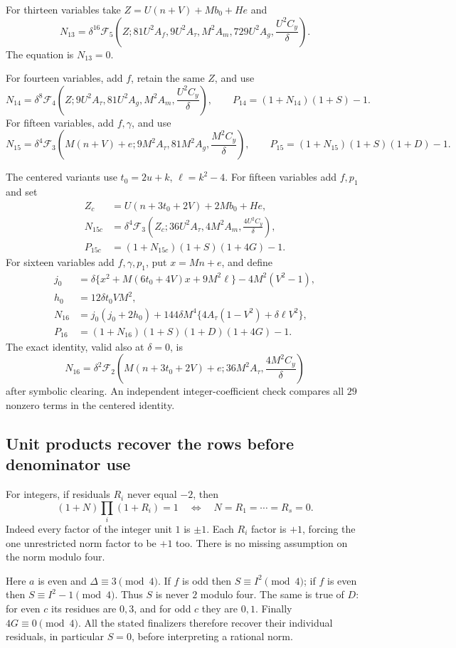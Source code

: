 \documentclass[11pt]{article}
\begin{document}
For thirteen variables take $Z=U(n+V)+Mb_0+He$ and
\[
 N_{13}=\delta^{16}\mathcal F_5\left(
 Z;81U^2A_f,9U^2A_\tau,M^2A_m,729U^2A_g,
 \frac{U^2C_y}{\delta}\right).
\]
The equation is $N_{13}=0$.

For fourteen variables, add $f$, retain the same $Z$, and use
\[
 N_{14}=\delta^8\mathcal F_4\left(
 Z;9U^2A_\tau,81U^2A_g,M^2A_m,
 \frac{U^2C_y}{\delta}\right),\qquad
 P_{14}=(1+N_{14})(1+S)-1.
\]
For fifteen variables, add $f,\gamma$, and use
\[
 N_{15}=\delta^4\mathcal F_3\left(
 M(n+V)+e;9M^2A_\tau,81M^2A_g,
 \frac{M^2C_y}{\delta}\right),
 \qquad P_{15}=(1+N_{15})(1+S)(1+D)-1.
\]

The centered variants use $t_0=2u+k$, $\ell=k^2-4$.
For fifteen variables add $f,p_1$ and set
\begin{align*}
 Z_c&=U(n+3t_0+2V)+2Mb_0+He,\\
 N_{15c}&=\delta^4\mathcal F_3\left(
 Z_c;36U^2A_\tau,4M^2A_m,\frac{4U^2C_y}{\delta}\right),\\
 P_{15c}&=(1+N_{15c})(1+S)(1+4G)-1.
\end{align*}
For sixteen variables add $f,\gamma,p_1$, put $x=Mn+e$, and define
\begin{align*}
 j_0&=\delta\{x^2+M(6t_0+4V)x+9M^2\ell\}
       -4M^2(V^2-1),\\
 h_0&=12\delta t_0VM^2,\\
 N_{16}&=j_0(j_0+2h_0)
  +144\delta M^4\{4A_\tau(1-V^2)+\delta\ell V^2\},\\
 P_{16}&=(1+N_{16})(1+S)(1+D)(1+4G)-1.
\end{align*}
The exact identity, valid also at $\delta=0$, is
\[
 N_{16}=\delta^2\mathcal F_2\left(
 M(n+3t_0+2V)+e;36M^2A_\tau,
 \frac{4M^2C_y}{\delta}\right)
\]
after symbolic clearing. An independent integer-coefficient check compares
all $29$ nonzero terms in the centered identity.

\subsection{Unit products recover the rows before denominator use}
For integers, if residuals $R_i$ never equal $-2$, then
\[
 (1+N)\prod_i(1+R_i)=1
 \quad\Longleftrightarrow\quad N=R_1=\cdots=R_s=0.
\]
Indeed every factor of the integer unit $1$ is $\pm1$. Each $R_i$ factor
is $+1$, forcing the one unrestricted norm factor to be $+1$ too.
There is no missing assumption on the norm modulo four.

Here $a$ is even and $\Delta\equiv3\pmod4$. If $f$ is odd then
$S\equiv I^2\pmod4$; if $f$ is even then $S\equiv I^2-1\pmod4$.
Thus $S$ is never $2$ modulo four. The same is true of $D$: for even $c$
its residues are $0,3$, and for odd $c$ they are $0,1$.
Finally $4G\equiv0\pmod4$. All the stated finalizers therefore recover
their individual residuals, in particular $S=0$, before interpreting a
rational norm.
\end{document}
